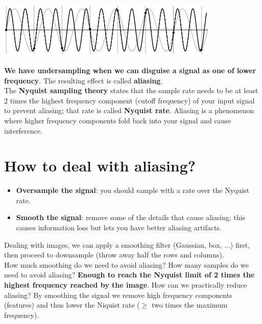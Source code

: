 \documentclass{article}
\begin{document}
\begin{center}
\includegraphics[width=0.8\textwidth]{images/undersampling_higher_freq.png}
\end{center}

\newpage

\textbf{We have undersampling when we can disguise a signal as one of lower frequency}. The resulting effect is called \textbf{aliasing}. \\

The \textbf{Nyquist sampling theory} states that the sample rate needs to be at least 2 times the highest frequency component (cutoff frequency) of your input signal to prevent aliasing; that rate is called \textbf{Nyquist rate}. Aliasing is a phenomenon where higher frequency components fold back into your signal and cause interference.

\section*{How to deal with aliasing?}

\begin{itemize}
    \item \textbf{Oversample the signal}: you should sample with a rate over the Nyquist rate.
    \item \textbf{Smooth the signal}: remove some of the details that cause aliasing; this causes information loss but lets you have better aliasing artifacts. 
\end{itemize}

Dealing with images, we can apply a smoothing filter (Gaussian, box, ...) first, then proceed to downsample (throw away half the rows and columns). \\

How much smoothing do we need to avoid aliasing? How many samples do we need to avoid aliasing? \textbf{Enough to reach the Nyquist limit of 2 times the highest frequency reached by the image}. How can we practically reduce aliasing? By smoothing the signal we remove high frequency components (features) and thus lower the Niquist rate ($\geq$ two times the maximum frequency).

\newpage
\end{document}
